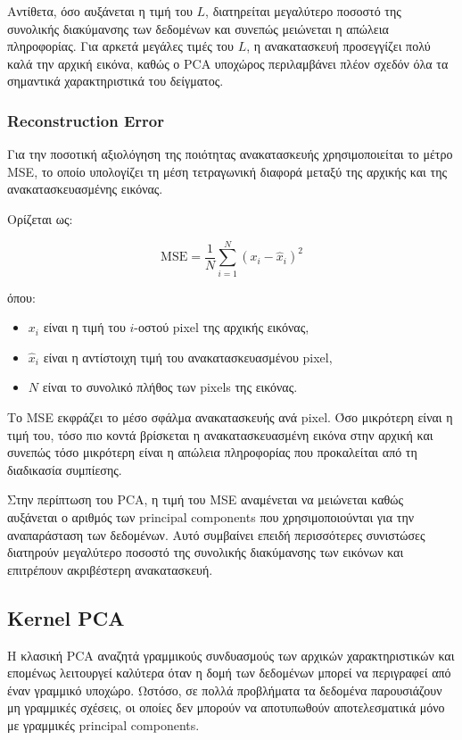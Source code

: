 \documentclass[12pt]{article}
\begin{document}
Αντίθετα, όσο αυξάνεται η τιμή του $L$, διατηρείται μεγαλύτερο ποσοστό της συνολικής διακύμανσης των δεδομένων και συνεπώς μειώνεται η απώλεια 
πληροφορίας. Για αρκετά μεγάλες τιμές του $L$, η ανακατασκευή προσεγγίζει πολύ καλά την αρχική εικόνα, καθώς ο PCA υποχώρος περιλαμβάνει πλέον 
σχεδόν όλα τα σημαντικά χαρακτηριστικά του δείγματος.


\subsubsection{Reconstruction Error}
Για την ποσοτική αξιολόγηση της ποιότητας ανακατασκευής χρησιμοποιείται το μέτρο MSE, το οποίο υπολογίζει τη μέση τετραγωνική διαφορά μεταξύ της αρχικής 
και της ανακατασκευασμένης εικόνας.

Ορίζεται ως:

\begin{equation}
    \mathrm{MSE}
    =
    \frac{1}{N}
    \sum_{i=1}^{N}
    (x_i-\hat{x}_i)^2
    \end{equation}

όπου:

\begin{itemize}
\item $x_i$ είναι η τιμή του $i$-οστού pixel της αρχικής εικόνας,
\item $\hat{x}_i$ είναι η αντίστοιχη τιμή του ανακατασκευασμένου pixel,
\item $N$ είναι το συνολικό πλήθος των pixels της εικόνας.
\end{itemize}

Το MSE εκφράζει το μέσο σφάλμα ανακατασκευής ανά pixel. Όσο μικρότερη είναι η τιμή του, τόσο πιο κοντά βρίσκεται η ανακατασκευασμένη εικόνα στην αρχική 
και συνεπώς τόσο μικρότερη είναι η απώλεια πληροφορίας που προκαλείται από τη διαδικασία συμπίεσης.

Στην περίπτωση του PCA, η τιμή του MSE αναμένεται να μειώνεται καθώς αυξάνεται ο αριθμός των principal components που χρησιμοποιούνται για την 
αναπαράσταση των δεδομένων. Αυτό συμβαίνει επειδή περισσότερες συνιστώσες διατηρούν μεγαλύτερο ποσοστό της συνολικής διακύμανσης των εικόνων και 
επιτρέπουν ακριβέστερη ανακατασκευή.

\subsection{Kernel PCA}
Η κλασική PCA αναζητά γραμμικούς συνδυασμούς των αρχικών χαρακτηριστικών και επομένως λειτουργεί καλύτερα όταν η δομή των δεδομένων μπορεί να περιγραφεί 
από έναν γραμμικό υποχώρο. Ωστόσο, σε πολλά προβλήματα τα δεδομένα παρουσιάζουν μη γραμμικές σχέσεις, οι οποίες δεν μπορούν να αποτυπωθούν αποτελεσματικά 
μόνο με γραμμικές principal components.
\end{document}

